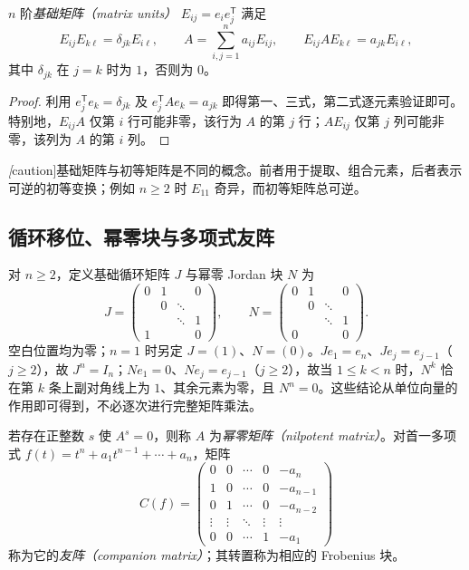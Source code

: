 \begin{proposition}
\label{prop:matrix-units}
$n$ 阶\emph{基础矩阵（matrix units）} $E_{ij}=e_ie_j^{\mathsf T}$ 满足
\begin{equation}
 E_{ij}E_{k\ell}=\delta_{jk}E_{i\ell},\qquad
 A=\sum_{i,j=1}^n a_{ij}E_{ij},\qquad
 E_{ij}AE_{k\ell}=a_{jk}E_{i\ell},
 \label{eq:matrix-unit-rules}
\end{equation}
其中 $\delta_{jk}$ 在 $j=k$ 时为 $1$，否则为 $0$。
\end{proposition}
\begin{proof}
利用 $e_j^{\mathsf T}e_k=\delta_{jk}$ 及 $e_j^{\mathsf T}Ae_k=a_{jk}$ 即得第一、三式，第二式逐元素验证即可。特别地，$E_{ij}A$ 仅第 $i$ 行可能非零，该行为 $A$ 的第 $j$ 行；$AE_{ij}$ 仅第 $j$ 列可能非零，该列为 $A$ 的第 $i$ 列。
\end{proof}

\emph[caution]{基础矩阵与初等矩阵是不同的概念。}前者用于提取、组合元素，后者表示可逆的初等变换；例如 $n\ge2$ 时 $E_{11}$ 奇异，而初等矩阵总可逆。

\subsection{循环移位、幂零块与多项式友阵}

对 $n\ge2$，定义基础循环矩阵 $J$ 与幂零 Jordan 块 $N$ 为
\[
 J=\begin{pmatrix}0&1&&0\\ &0&\ddots&\\ &&\ddots&1\\1&&&0\end{pmatrix},\qquad
 N=\begin{pmatrix}0&1&&0\\ &0&\ddots&\\ &&\ddots&1\\0&&&0\end{pmatrix}.
\]
空白位置均为零；$n=1$ 时另定 $J=(1)$、$N=(0)$。$Je_1=e_n$、$Je_j=e_{j-1}$（$j\ge2$），故 $J^n=I_n$；$Ne_1=0$、$Ne_j=e_{j-1}$（$j\ge2$），故当 $1\le k<n$ 时，$N^k$ 恰在第 $k$ 条上副对角线上为 $1$、其余元素为零，且 $N^n=0$。这些结论从单位向量的作用即可得到，不必逐次进行完整矩阵乘法。

\begin{definition}
若存在正整数 $s$ 使 $A^s=0$，则称 $A$ 为\emph{幂零矩阵（nilpotent matrix）}。对首一多项式 $f(t)=t^n+a_1t^{n-1}+\cdots+a_n$，矩阵
\[
 C(f)=\begin{pmatrix}
 0&0&\cdots&0&-a_n\\
 1&0&\cdots&0&-a_{n-1}\\
 0&1&\cdots&0&-a_{n-2}\\
 \vdots&\vdots&\ddots&\vdots&\vdots\\
 0&0&\cdots&1&-a_1
 \end{pmatrix}
\]
称为它的\emph{友阵（companion matrix）}；其转置称为相应的 Frobenius 块。
\end{definition}

